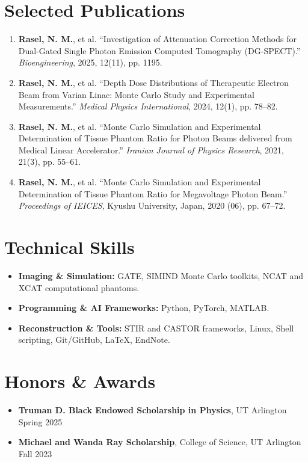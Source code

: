 \documentclass[11pt,letterpaper]{article}
\begin{document}
\section*{Selected Publications}
\begin{enumerate}[leftmargin=1.5em, itemsep=2pt]
    \item \textbf{Rasel, N. M.}, et al. ``Investigation of Attenuation Correction Methods for Dual-Gated Single Photon Emission Computed Tomography (DG-SPECT).'' \textit{Bioengineering}, 2025, 12(11), pp. 1195.
    \item \textbf{Rasel, N. M.}, et al. ``Depth Dose Distributions of Therapeutic Electron Beam from Varian Linac: Monte Carlo Study and Experimental Measurements.'' \textit{Medical Physics International}, 2024, 12(1), pp. 78--82.
    \item \textbf{Rasel, N. M.}, et al. ``Monte Carlo Simulation and Experimental Determination of Tissue Phantom Ratio for Photon Beams delivered from Medical Linear Accelerator.'' \textit{Iranian Journal of Physics Research}, 2021, 21(3), pp. 55--61.
    \item \textbf{Rasel, N. M.}, et al. ``Monte Carlo Simulation and Experimental Determination of Tissue Phantom Ratio for Megavoltage Photon Beam.'' \textit{Proceedings of IEICES}, Kyushu University, Japan, 2020 (06), pp. 67--72.
\end{enumerate}

\section*{Technical Skills}
\begin{itemize}[leftmargin=1.5em, itemsep=2pt]
    \item \textbf{Imaging \& Simulation:} GATE, SIMIND Monte Carlo toolkits, NCAT and XCAT computational phantoms.
    \item \textbf{Programming \& AI Frameworks:} Python, PyTorch, MATLAB.
    \item \textbf{Reconstruction \& Tools:} STIR and CASTOR frameworks, Linux, Shell scripting, Git/GitHub, LaTeX, EndNote.
\end{itemize}

\section*{Honors \& Awards}
\begin{itemize}[leftmargin=1.5em, itemsep=2pt]
    \item \textbf{Truman D. Black Endowed Scholarship in Physics}, UT Arlington \hfill Spring 2025
    \item \textbf{Michael and Wanda Ray Scholarship}, College of Science, UT Arlington \hfill Fall 2023
\end{itemize}
\end{document}
